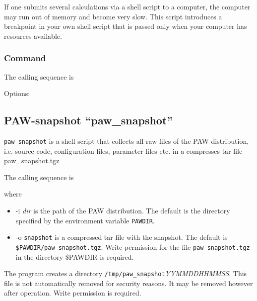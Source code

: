 \documentclass[final,12pt]{article}
\begin{document}
{{{{{{If one submits several calculations via a shell script to a computer, the
computer may run out of memory and become very slow. This script
introduces a breakpoint in your own shell script that is passed only
when your computer has resources available.

\subsubsection{Command}
The calling sequence is

\bigskip{}
\vspace{0.5cm}

\noindent Options:\\[2mm]
\hspace*{1cm}

\subsection{PAW-snapshot ``paw\_snapshot''}
{\tt paw\_snapshot} is a shell script that collects all raw files of
the PAW distribution, i.e. source code, configuration files,
parameter files etc. in a compresses tar file paw\_snapshot.tgz

The calling sequence is

\bigskip{}
\bigskip

where 
\begin{itemize}
\item -i \textit{dir} is the path of the PAW distribution. The default
  is the directory specified by the environment variable
  \texttt{PAWDIR}.
\item -o \texttt{snapshot} is a compressed tar file with the
  snapshot. The default is \texttt{\$PAWDIR/paw\_snapshot.tgz}.  Write
  permission for the file \texttt{paw\_snapshot.tgz} in the directory
  \$PAWDIR is required.  
\end{itemize}
The program creates a directory
\texttt{/tmp/paw\_snapshot}\textit{YYMMDDHHMMSS}. This file is not
automatically removed for security reasons. It may be removed however
after operation. Write permission is required.


}}}}}}
\end{document}
